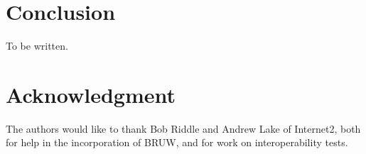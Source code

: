 \documentclass[conference]{IEEEtran}
\begin{document}
\section{Conclusion}
To be written.


\section*{Acknowledgment}
The authors would like to thank Bob Riddle and Andrew Lake of Internet2, both
for help in the incorporation of BRUW, and for work on interoperability tests.



%
%
%
\end{document}
